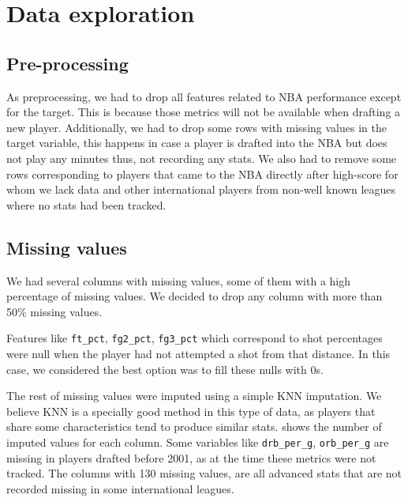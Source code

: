
\section{Data exploration}%
\label{sec:data-exploration}

\subsection{Pre-processing}%
\label{sub:pre-processing}

As preprocessing, we had to drop all features related to NBA performance except for the target. This is because those metrics will not be available when drafting a new player. Additionally, we had to drop some rows with missing values in the target variable, this happens in case a player is drafted into the NBA but does not play any minutes thus, not recording any stats. We also had to remove some rows corresponding to players that came to the NBA directly after high-score for whom we lack data and other international players from non-well known leagues where no stats had been tracked. 

\subsection{Missing values}%
\label{sub:missing-values}


We had several columns with missing values, some of them with a high percentage of missing values. We decided to drop any column with more than 50\% missing values. 

Features like \texttt{ft\_pct}, \texttt{fg2\_pct}, \texttt{fg3\_pct} which correspond to shot percentages were null when the player had not attempted a shot from that distance. In this case, we considered the best option was to fill these nulls with 0s. 

The rest of missing values were imputed using a simple KNN imputation. We believe KNN is a specially good method in this type of data, as players that share some characteristics tend to produce similar stats.  shows the number of imputed
values for each column. Some variables like \texttt{drb\_per\_g}, \texttt{orb\_per\_g} are missing in players drafted before 2001, as at the time these metrics were not tracked. The columns with 130 missing values, are all advanced stats that are not recorded missing in some international leagues. 

